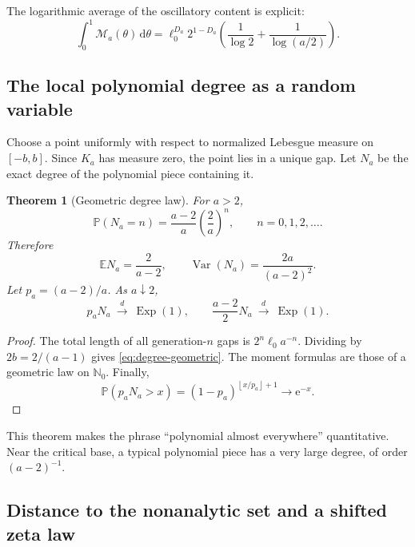 \documentclass[11pt,oneside]{article}
\newtheorem{theorem}{Theorem}[section]
\theoremstyle{definition}
\theoremstyle{remark}
\newcommand{\N}{\mathbb N}
\newcommand{\e}{\mathrm e}
\newcommand{\dd}{\,\mathrm d}
\newcommand{\Var}{\operatorname{Var}}
\newcommand{\E}{\mathbb E}
\newcommand{\Prob}{\mathbb P}
\newcommand{\floor}[1]{\left\lfloor #1\right\rfloor}
\begin{document}
The logarithmic average of the oscillatory content is explicit:
\begin{equation}
 \int_0^1\mathcal M_a(\theta)\dd\theta
 =\ell_0^{D_a}2^{1-D_a}
 \left(\frac1{\log2}+\frac1{\log(a/2)}\right).
 \label{eq:average-Minkowski}
\end{equation}

\subsection{The local polynomial degree as a random variable}

Choose a point uniformly with respect to normalized Lebesgue measure on $[-b,b]$.
Since $K_a$ has measure zero, the point lies in a unique gap.  Let $N_a$ be the exact degree
of the polynomial piece containing it.

\begin{theorem}[Geometric degree law]
\label{thm:degree-law}
For $a>2$,
\begin{equation}
 \Prob(N_a=n)=\frac{a-2}{a}\left(\frac2a\right)^n,
 \qquad n=0,1,2,\ldots.
 \label{eq:degree-geometric}
\end{equation}
Therefore
\begin{equation}
 \E N_a=\frac2{a-2},
 \qquad
 \Var(N_a)=\frac{2a}{(a-2)^2}.
 \label{eq:degree-moments}
\end{equation}
Let $p_a=(a-2)/a$.  As $a\downarrow2$,
\begin{equation}
 p_aN_a\ \xrightarrow{\ d\ }\ \operatorname{Exp}(1),
 \qquad
 \frac{a-2}{2}N_a\ \xrightarrow{\ d\ }\ \operatorname{Exp}(1).
 \label{eq:degree-critical-limit}
\end{equation}
\end{theorem}

\begin{proof}
The total length of all generation-$n$ gaps is $2^n\ell_0a^{-n}$.  Dividing by
$2b=2/(a-1)$ gives \eqref{eq:degree-geometric}.  The moment formulas are those of a
geometric law on $\N_0$.  Finally,
\[
 \Prob(p_aN_a>x)=(1-p_a)^{\floor{x/p_a}+1}\longrightarrow\e^{-x}.
\]
\end{proof}

This theorem makes the phrase ``polynomial almost everywhere'' quantitative.  Near the
critical base, a typical polynomial piece has a very large degree, of order $(a-2)^{-1}$.

\subsection{Distance to the nonanalytic set and a shifted zeta law}
\end{document}
